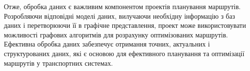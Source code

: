 Отже, обробка даних є важливим компонентом проектів планування маршрутів. Розробляючи відповідні моделі даних, вилучаючи необхідну інформацію з баз даних і перетворюючи її в графічне представлення, проект може використовувати можливості графових алгоритмів для розрахунку оптимізованих маршрутів. Ефективна обробка даних забезпечує отримання точних, актуальних і структурованих даних, які є основою для ефективного планування та оптимізації маршрутів у транспортних системах.



